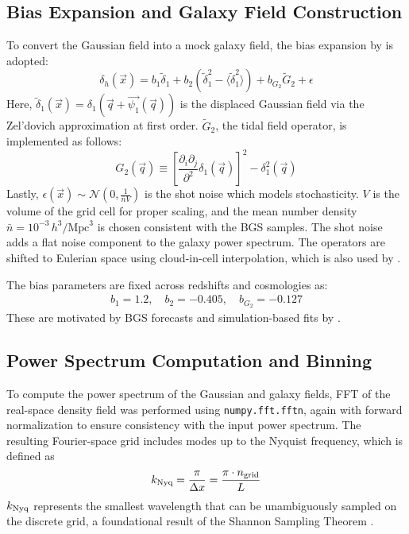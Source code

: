 \documentclass[trackchanges]{aastex7}
\begin{document}
\subsection{Bias Expansion and Galaxy Field Construction}

To convert the Gaussian field into a mock galaxy field, the bias expansion by \citet{Schmittfull2019} is adopted:
\begin{equation}
\delta_h(\vec{x}) = b_1 \tilde{\delta}_1 + b_2 (\tilde{\delta}_1^2 - \langle \tilde{\delta}_1^2 \rangle) + b_{G_2} \tilde{G}_2 + \epsilon
\end{equation}
Here, $\tilde{\delta}_1(\vec{x}) = \delta_1(\vec{q} + \vec{\psi_1}(\vec{q}))$ is the displaced Gaussian field via the Zel'dovich approximation at first order. 
$\tilde{G}_2$, the tidal field operator, is implemented as follows:
\begin{equation}
    G_2 (\vec{q}) \equiv \left[\frac{\partial_i \partial_j}{\partial^2} \delta_1 (\vec{q})\right]^2 - \delta_1^2 (\vec{q})
\end{equation}
Lastly, $\epsilon(\vec{x}) \sim  \mathcal{N}\left(0, \frac{1}{\bar{n} V}\right)$ is the shot noise which models stochasticity. 
$V$ is the volume of the grid cell for proper scaling, and the mean number density $\bar{n} = 10^{-3} \, h^3/\mathrm{Mpc}^3$ is chosen consistent with the \citet{DESI2025} BGS samples. 
The shot noise adds a flat noise component to the galaxy power spectrum.
The operators are shifted to Eulerian space using cloud-in-cell interpolation, which is also used by \citet{Schmittfull2019}.

The bias parameters are fixed across redshifts and cosmologies as:
\begin{align}
b_1 = 1.2, \quad b_2 = -0.405, \quad b_{G_2} = -0.127
\end{align}
These are motivated by \citet{DESI2016} BGS forecasts and simulation-based fits by \citet{Chen2021}.


\subsection{Power Spectrum Computation and Binning}

To compute the power spectrum of the Gaussian and galaxy fields, FFT of the real-space density field was performed  using \texttt{numpy.fft.fftn}, again with forward normalization to ensure consistency with the input power spectrum. 
The resulting Fourier-space grid includes modes up to the Nyquist frequency, which is defined as
\[
k_{\rm Nyq} = \frac{\pi}{\Delta x} = \frac{\pi \cdot n_{\rm grid}}{L}
\]
$k_{\rm Nyq}$ represents the smallest wavelength that can be unambiguously sampled on the discrete grid, a foundational result of the Shannon Sampling Theorem \citep{Shannon1949}.
\end{document}
